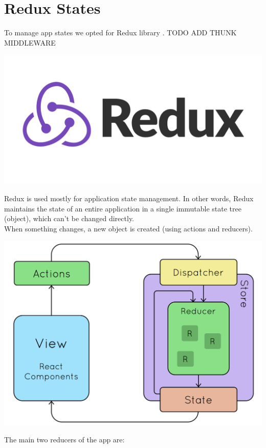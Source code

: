 \documentclass[12pt,hidelinks]{article}
\begin{document}
\section{Redux States}
\vspace{10.5cm}
To manage app states we opted for Redux library \cite{Redux}. TODO ADD THUNK MIDDLEWARE
\begin{center}
	\includegraphics[scale=0.2]{redux-logo}
\end{center}
Redux is used mostly for application state management. 
In other words, Redux maintains the state of an entire application in a single immutable state tree (object), which can't be changed directly.\\
When something changes, a new object is created (using actions and reducers).
\begin{center}
	\includegraphics[scale=0.25]{Redux-workflow}
\end{center}
The main two reducers of the app are:
\end{document}
